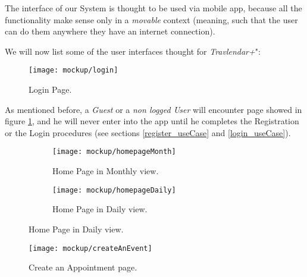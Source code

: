 The interface of our System is thought to be used via mobile app, because all the functionality make sense only in a \textit{movable} context (meaning, such that the user can do them anywhere they have an internet connection).

We will now list some of the user interfaces thought for \textit{Travlendar+}":

\begin{figure}[h]
	\texttt{[image: mockup/login]}
	\centering
	\caption{Login Page.}
	\label{fig:login}
\end{figure}
As mentioned before, a \textit{Guest} or a \textit{non logged User} will encounter page showed in figure \ref{fig:login}, and he will never enter into the app until he completes the Registration or the Login procedures (see sections \ref{register_useCase} and \ref{login_useCase}).

\begin{figure}[H]
	\begin{subfigure}{0.5\textwidth}
		\texttt{[image: mockup/homepageMonth]} 
		\centering
		\caption{Home Page in Monthly view.}
		\label{fig:homePage_Month}
	\end{subfigure}
	\begin{subfigure}{0.5\textwidth}
		\texttt{[image: mockup/homepageDaily]} 
		\centering
		\caption{Home Page in Daily view.}
		\label{fig:homePage_Day}
	\end{subfigure}
\end{figure}

\begin{figure}[h]
	\texttt{[image: mockup/createAnEvent]}
	\centering
	\caption{Create an Appointment page.}
	\label{fig:createEvent}
\end{figure}

\vfill